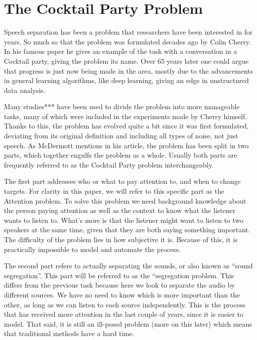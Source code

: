 \documentclass{book}
\begin{document}
\chapter{The Cocktail Party Problem}
\qquad Speech separation has been a problem that researchers have been interested in for years. So much so that the problem was formulated decades ago by Colin Cherry\cite{Cherry}. In his famous paper he gives an example of the task with a conversation in a Cocktail party, giving the problem its name. Over 65 years later one could argue that progress is just now being made in the area, mostly due to the advancements in general learning algorithms, like deep learning, giving an edge in unstructured data analysis.
\par
Many studies*** have been used to divide the problem into more manageable tasks, many of which were included in the experiments made by Cherry himself. Thanks to this, the problem has evolved quite a bit since it was first formulated, deviating from its original definition and including all types of noise, not just speech. As McDermott mentions in his article\cite{CocktailPartyProblemRevisit}, the problem has been split in two parts, which together engulfs the problem as a whole. Usually both parts are frequently referred to as the Cocktail Party problem interchangeably.
\par
The first part addresses who or what to pay attention to, and when to change targets. For clarity in this paper, we will refer to this specific part as the Attention problem. To solve this problem we need background knowledge about the person paying attention as well as the context to know what the listener wants to listen to. What's more is that the listener might want to listen to two speakers at the same time, given that they are both saying something important. The difficulty of the problem lies in how subjective it is. Because of this, it is practically impossible to model and automate the process.
\par
The second part refers to actually separating the sounds, or also known as “sound segregation”. This part will be referred to as the “segregation problem. This differs from the previous task because here we look to separate the audio by different sources. We have no need to know which is more important than the other, as long as we can listen to each source independently. This is the process that has received more attention in the last couple of years, since it is easier to model. That said, it is still an ill-posed problem (more on this later) which means that traditional methods have a hard time.
\end{document}
